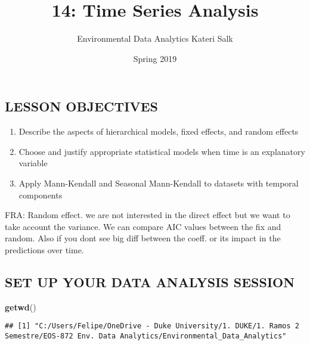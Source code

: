 \documentclass[]{article}
\title{14: Time Series Analysis}
\author{Environmental Data Analytics \textbar{} Kateri Salk}
\date{Spring 2019}
\newenvironment{Shaded}{\begin{snugshade}}{\end{snugshade}}
\newcommand{\KeywordTok}[1]{\textcolor[rgb]{0.13,0.29,0.53}{\textbf{#1}}}
\newcommand{\NormalTok}[1]{#1}
\providecommand{\tightlist}{%
  \setlength{\itemsep}{0pt}\setlength{\parskip}{0pt}}
\begin{document}
\maketitle

\subsection{LESSON OBJECTIVES}\label{lesson-objectives}

\begin{enumerate}
\def\labelenumi{\arabic{enumi}.}
\tightlist
\item
  Describe the aspects of hierarchical models, fixed effects, and random
  effects
\item
  Choose and justify appropriate statistical models when time is an
  explanatory variable
\item
  Apply Mann-Kendall and Seasonal Mann-Kendall to datasets with temporal
  components
\end{enumerate}

FRA: Random effect. we are not interested in the direct effect but we
want to take account the variance. We can compare AIC values between the
fix and random. Also if you dont see big diff between the coeff. or its
impact in the predictions over time.

\subsection{SET UP YOUR DATA ANALYSIS
SESSION}\label{set-up-your-data-analysis-session}

\begin{Shaded}
\begin{Highlighting}[]
\KeywordTok{getwd}\NormalTok{()}
\end{Highlighting}
\end{Shaded}

\begin{verbatim}
## [1] "C:/Users/Felipe/OneDrive - Duke University/1. DUKE/1. Ramos 2 Semestre/EOS-872 Env. Data Analytics/Environmental_Data_Analytics"
\end{verbatim}
\end{document}
